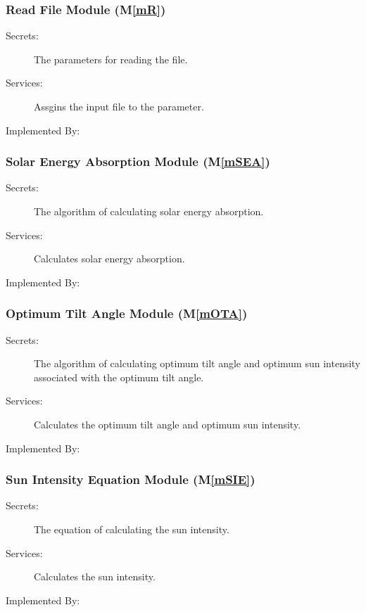 \documentclass[12pt, titlepage]{article}
\newcommand{\mref}[1]{M\ref{#1}}
\begin{document}
\subsubsection{Read File Module (\mref{mR})}

\begin{description}
\item[Secrets:] The parameters for reading the file.
\item[Services:] Assgins  the input file to the parameter.
\item[Implemented By:] \progname
\end{description}

\subsubsection{Solar Energy Absorption Module (\mref{mSEA})}

\begin{description}
\item[Secrets:]The algorithm of calculating solar energy absorption.
\item[Services:] Calculates solar energy absorption.

\item[Implemented By:] \progname
\end{description}


\subsubsection{Optimum Tilt Angle Module (\mref{mOTA})}

\begin{description}
\item[Secrets:]The algorithm of calculating optimum tilt angle and optimum sun intensity associated with the optimum tilt angle.
\item[Services:] Calculates the optimum tilt angle and optimum sun intensity.
\item[Implemented By:] \progname
\end{description}

\subsubsection{Sun Intensity Equation Module (\mref{mSIE})}

\begin{description}
\item[Secrets:]The equation of calculating the sun intensity.
\item[Services:] Calculates the sun intensity.
\item[Implemented By:] \progname
\end{description}
\end{document}
